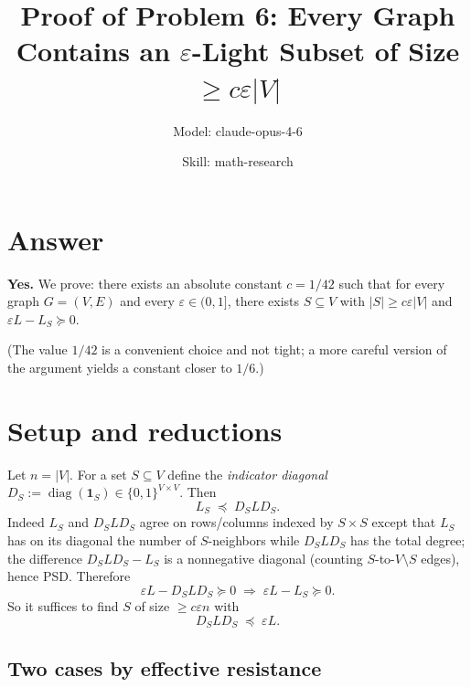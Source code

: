 

\title{Proof of Problem 6: Every Graph Contains an $\varepsilon$-Light Subset of Size $\geq c\varepsilon|V|$}
\author{Model: claude-opus-4-6 \and Skill: math-research}
\date{}

\newtheorem{theorem}{Theorem}
\newtheorem{lemma}[theorem]{Lemma}
\newtheorem{claim}[theorem]{Claim}
\newtheorem{proposition}[theorem]{Proposition}


\maketitle

\section*{Answer}

\textbf{Yes.} We prove: there exists an absolute constant $c=1/42$ such that for every graph $G=(V,E)$ and every $\varepsilon\in(0,1]$, there exists $S\subseteq V$ with $|S|\geq c\varepsilon|V|$ and $\varepsilon L - L_S \succeq 0$.

(The value $1/42$ is a convenient choice and not tight; a more careful version of the argument yields a constant closer to $1/6$.)

\section{Setup and reductions}

Let $n=|V|$. For a set $S\subseteq V$ define the \emph{indicator diagonal} $D_S := \operatorname{diag}(\mathbf{1}_S)\in\{0,1\}^{V\times V}$. Then
\[
   L_S \;\preceq\; D_S L D_S.
\]
Indeed $L_S$ and $D_SLD_S$ agree on rows/columns indexed by $S\times S$ except that $L_S$ has on its diagonal the number of $S$-neighbors while $D_SLD_S$ has the total degree; the difference $D_SLD_S - L_S$ is a nonnegative diagonal (counting $S$-to-$V\setminus S$ edges), hence PSD. Therefore
\[
   \varepsilon L - D_S L D_S \succeq 0 \;\Longrightarrow\; \varepsilon L - L_S \succeq 0.
\]
So it suffices to find $S$ of size $\geq c\varepsilon n$ with
\begin{equation}\label{eq:main}
   D_S L D_S \;\preceq\; \varepsilon L.
\end{equation}

\subsection{Two cases by effective resistance}

